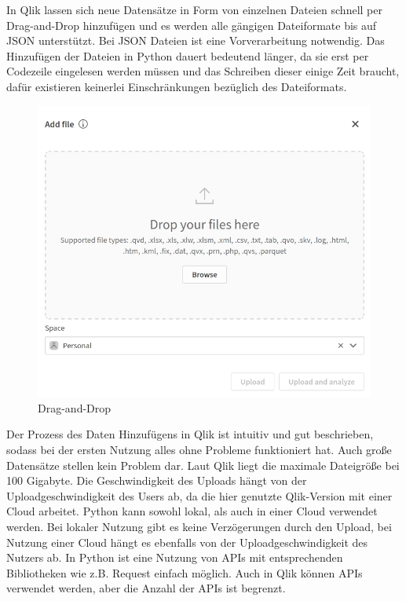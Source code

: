 \documentclass[12pt]{article}
\begin{document}
	In Qlik lassen sich neue Datensätze in Form von einzelnen Dateien schnell per Drag-and-Drop hinzufügen und es werden alle gängigen Dateiformate bis auf JSON unterstützt. Bei JSON Dateien ist eine Vorverarbeitung notwendig. Das Hinzufügen der Dateien in Python dauert bedeutend länger, da sie erst per Codezeile eingelesen werden müssen und das Schreiben dieser einige Zeit braucht, dafür existieren keinerlei Einschränkungen bezüglich des Dateiformats.
	\begin{figure}[h]
		\centering
		\includegraphics[width=1.0\textwidth]{dragndrop}
		\caption{Drag-and-Drop}
	\end{figure}
	
	Der Prozess des Daten Hinzufügens in Qlik ist intuitiv und gut beschrieben, sodass bei der ersten Nutzung alles ohne Probleme funktioniert hat. Auch große Datensätze stellen kein Problem dar. Laut Qlik liegt die maximale Dateigröße bei 100 Gigabyte. Die Geschwindigkeit des Uploads hängt von der Uploadgeschwindigkeit des Users ab, da die hier genutzte Qlik-Version mit einer Cloud arbeitet. Python kann sowohl lokal, als auch in einer Cloud verwendet werden. Bei lokaler Nutzung gibt es keine Verzögerungen durch den Upload, bei Nutzung einer Cloud hängt es ebenfalls von der Uploadgeschwindigkeit des Nutzers ab.
	In Python ist eine Nutzung von APIs mit entsprechenden Bibliotheken wie z.B. Request einfach möglich.
	Auch in Qlik können APIs verwendet werden, aber die Anzahl der APIs ist begrenzt.
	
\end{document}
